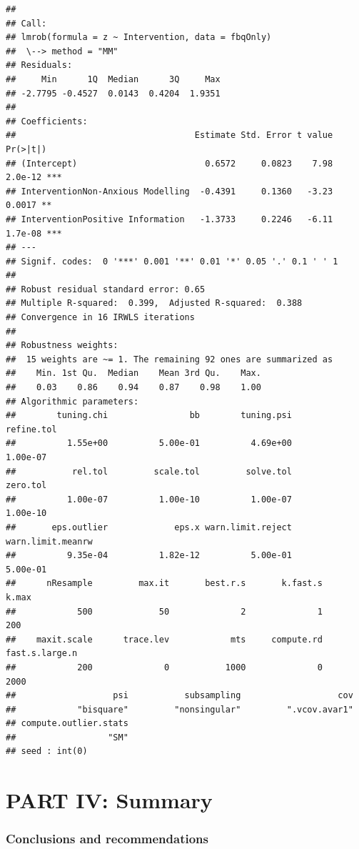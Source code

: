 \documentclass[
]{article}
\begin{document}
\begin{verbatim}
## 
## Call:
## lmrob(formula = z ~ Intervention, data = fbqOnly)
##  \--> method = "MM"
## Residuals:
##     Min      1Q  Median      3Q     Max 
## -2.7795 -0.4527  0.0143  0.4204  1.9351 
## 
## Coefficients:
##                                   Estimate Std. Error t value Pr(>|t|)    
## (Intercept)                         0.6572     0.0823    7.98  2.0e-12 ***
## InterventionNon-Anxious Modelling  -0.4391     0.1360   -3.23   0.0017 ** 
## InterventionPositive Information   -1.3733     0.2246   -6.11  1.7e-08 ***
## ---
## Signif. codes:  0 '***' 0.001 '**' 0.01 '*' 0.05 '.' 0.1 ' ' 1
## 
## Robust residual standard error: 0.65 
## Multiple R-squared:  0.399,  Adjusted R-squared:  0.388 
## Convergence in 16 IRWLS iterations
## 
## Robustness weights: 
##  15 weights are ~= 1. The remaining 92 ones are summarized as
##    Min. 1st Qu.  Median    Mean 3rd Qu.    Max. 
##    0.03    0.86    0.94    0.87    0.98    1.00 
## Algorithmic parameters: 
##        tuning.chi                bb        tuning.psi        refine.tol 
##          1.55e+00          5.00e-01          4.69e+00          1.00e-07 
##           rel.tol         scale.tol         solve.tol          zero.tol 
##          1.00e-07          1.00e-10          1.00e-07          1.00e-10 
##       eps.outlier             eps.x warn.limit.reject warn.limit.meanrw 
##          9.35e-04          1.82e-12          5.00e-01          5.00e-01 
##      nResample         max.it       best.r.s       k.fast.s          k.max 
##            500             50              2              1            200 
##    maxit.scale      trace.lev            mts     compute.rd fast.s.large.n 
##            200              0           1000              0           2000 
##                   psi           subsampling                   cov 
##            "bisquare"         "nonsingular"         ".vcov.avar1" 
## compute.outlier.stats 
##                  "SM" 
## seed : int(0)
\end{verbatim}

\part*{PART IV: Summary}\label{part-part-iv-summary}

\section*{Conclusions and recommendations}\label{conclusions-and-recommendations}
\end{document}
